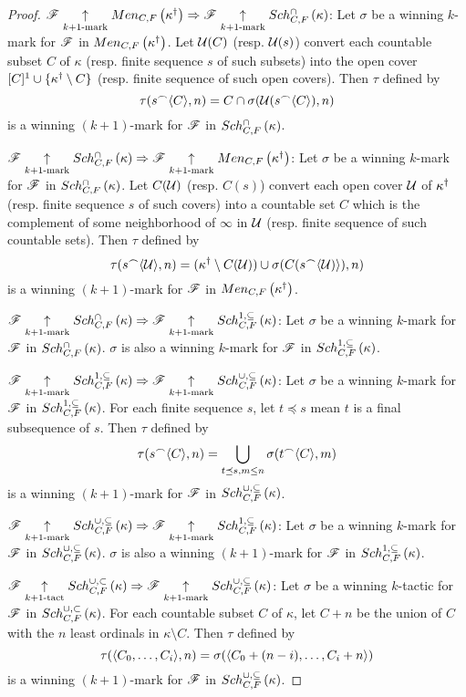 \documentclass{amsart}
\theoremstyle{definition}
\begin{document}
\begin{proof}
  \(\mathscr{F} \underset{k+1\text{-mark}}{\uparrow}Men_{C,F}\left({\kappa^\dagger}\right)
    \Rightarrow
  \mathscr{F} \underset{k+1\text{-mark}}{\uparrow}Sch^{\cap}_{C,F}\left({\kappa}\right)\):
  Let \(\sigma\) be a winning \(k\)-mark for \(\mathscr{F}\) in
  \(Men_{C,F}\left({\kappa^\dagger}\right)\). Let \(\mathcal{U}(C)\) (resp. \(\mathcal{U}(s)\)) convert each
  countable subset \(C\) of \(\kappa\) (resp. finite sequence \(s\) of such subsets)
  into the open cover \([C]^1\cup\{\kappa^\dagger\setminus C\}\)
  (resp. finite sequence of such open covers). Then \(\tau\) defined by
    \[
      \tau(s{^\frown}\langle C\rangle,n)
        =
      C\cap\sigma(\mathcal{U}(s{^\frown}\langle C\rangle),n)
    \]
  is a winning \((k+1)\)-mark for \(\mathscr{F}\) in \(Sch^{\cap}_{C,F}\left({\kappa}\right)\).

  \(\mathscr{F} \underset{k+1\text{-mark}}{\uparrow}Sch^{\cap}_{C,F}\left({\kappa}\right)
    \Rightarrow
  \mathscr{F} \underset{k+1\text{-mark}}{\uparrow}Men_{C,F}\left({\kappa^\dagger}\right)\):
  Let \(\sigma\) be a winning \(k\)-mark for \(\mathscr{F}\) in
  \(Sch^{\cap}_{C,F}\left({\kappa}\right)\). Let \(C(\mathcal{U})\) (resp. \(C(s)\)) convert each open
  cover \(\mathcal{U}\) of \(\kappa^\dagger\) (resp. finite sequence \(s\) of such covers)
  into a countable set \(C\) which is the complement of some neighborhood of
  \(\infty\) in \(\mathcal{U}\) (resp. finite sequence of such countable sets).
  Then \(\tau\) defined by
    \[
      \tau(s{^\frown}\langle\mathcal{U}\rangle,n)
        =
      (\kappa^\dagger\setminus C(\mathcal{U}))
        \cup
      \sigma(C(s{^\frown}\langle\mathcal{U})\rangle),n)
    \]
  is a winning \((k+1)\)-mark for \(\mathscr{F}\) in \(Men_{C,F}\left({\kappa^\dagger}\right)\).

  \(\mathscr{F} \underset{k+1\text{-mark}}{\uparrow}Sch^{\cap}_{C,F}\left({\kappa}\right)
    \Rightarrow
  \mathscr{F} \underset{k+1\text{-mark}}{\uparrow}Sch^{1,\subseteq}_{C,F}\left({\kappa}\right)\):
  Let \(\sigma\) be a winning \(k\)-mark for \(\mathscr{F}\) in
  \(Sch^{\cap}_{C,F}\left({\kappa}\right)\). \(\sigma\) is also a winning \(k\)-mark for \(\mathscr{F}\)
  in \(Sch^{1,\subseteq}_{C,F}\left({\kappa}\right)\).

  \(\mathscr{F} \underset{k+1\text{-mark}}{\uparrow}Sch^{1,\subseteq}_{C,F}\left({\kappa}\right)
    \Rightarrow
  \mathscr{F} \underset{k+1\text{-mark}}{\uparrow}Sch^{\cup,\subseteq}_{C,F}\left({\kappa}\right)\): Let \(\sigma\) be a winning \(k\)-mark for \(\mathscr{F}\) in
  \(Sch^{1,\subseteq}_{C,F}\left({\kappa}\right)\). For each finite sequence \(s\), let \(t\preceq s\) mean \(t\)
  is a final subsequence of \(s\). Then \(\tau\) defined by
    \[
      \tau(s{^\frown}\langle C\rangle,n)
        =
      \bigcup_{t\preceq s, m\leq n}
      \sigma(t{^\frown}\langle C\rangle,m)
    \]
  is a winning \((k+1)\)-mark for \(\mathscr{F}\) in \(Sch^{\cup,\subseteq}_{C,F}\left({\kappa}\right)\).

  \(\mathscr{F} \underset{k+1\text{-mark}}{\uparrow}Sch^{\cup,\subseteq}_{C,F}\left({\kappa}\right)
    \Rightarrow
  \mathscr{F} \underset{k+1\text{-mark}}{\uparrow}Sch^{1,\subseteq}_{C,F}\left({\kappa}\right)\):
  Let \(\sigma\) be a winning \(k\)-mark for \(\mathscr{F}\) in
  \(Sch^{\cup,\subseteq}_{C,F}\left({\kappa}\right)\). \(\sigma\) is also a winning
  \((k+1)\)-mark for \(\mathscr{F}\)
  in \(Sch^{1,\subseteq}_{C,F}\left({\kappa}\right)\).

  \(\mathscr{F} \underset{k+1\text{-tact}}{\uparrow}Sch^{\cup,\subset}_{C,F}\left({\kappa}\right)
    \Rightarrow
  \mathscr{F} \underset{k+1\text{-mark}}{\uparrow}Sch^{\cup,\subseteq}_{C,F}\left({\kappa}\right)\):
  Let \(\sigma\) be a winning \(k\)-tactic for \(\mathscr{F}\) in
  \(Sch^{\cup,\subset}_{C,F}\left({\kappa}\right)\). For each countable subset \(C\) of \(\kappa\), let \(C+n\)
  be the union of \(C\) with the \(n\) least ordinals in \(\kappa\setminus C\).
  Then \(\tau\) defined by
    \[
      \tau(\langle C_0,\dots,C_i\rangle,n)
        =
      \sigma(\langle C_0+(n-i),\dots,C_i+n\rangle)
    \]
  is a winning \((k+1)\)-mark for \(\mathscr{F}\) in \(Sch^{\cup,\subseteq}_{C,F}\left({\kappa}\right)\).
\end{proof}
\end{document}

